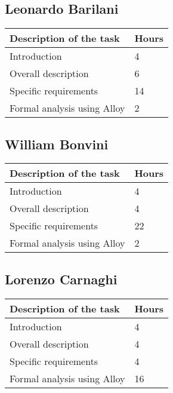 
\subsection{Leonardo Barilani}
\begin{table}[H]
\begin{tabular}{ll}
\hline
\multicolumn{1}{|l|}{Description of the task} & \multicolumn{1}{l|}{Hours} \\ \hline
\multicolumn{1}{|l|}{Introduction}            & \multicolumn{1}{l|}{4}     \\ \hline
\multicolumn{1}{|l|}{Overall description}     & \multicolumn{1}{l|}{6}     \\ \hline
\multicolumn{1}{|l|}{Specific requirements}   & \multicolumn{1}{l|}{14}     \\ \hline
\multicolumn{1}{|l|}{Formal analysis using Alloy}   & \multicolumn{1}{l|}{2}   \\ \hline
\end{tabular}
\end{table}


\subsection{William Bonvini}
\begin{table}[H]
\begin{tabular}{ll}
\hline
\multicolumn{1}{|l|}{Description of the task} & \multicolumn{1}{l|}{Hours} \\ \hline
\multicolumn{1}{|l|}{Introduction}            & \multicolumn{1}{l|}{4}     \\ \hline
\multicolumn{1}{|l|}{Overall description}     & \multicolumn{1}{l|}{4}     \\ \hline
\multicolumn{1}{|l|}{Specific requirements}   & \multicolumn{1}{l|}{22}     \\ \hline
\multicolumn{1}{|l|}{Formal analysis using Alloy}   & \multicolumn{1}{l|}{2}   \\ \hline
\end{tabular}
\end{table}


\subsection{Lorenzo Carnaghi}
\begin{table}[H]
\begin{tabular}{ll}
\hline
\multicolumn{1}{|l|}{Description of the task} & \multicolumn{1}{l|}{Hours} \\ \hline
\multicolumn{1}{|l|}{Introduction}            & \multicolumn{1}{l|}{4}     \\ \hline
\multicolumn{1}{|l|}{Overall description}     & \multicolumn{1}{l|}{4}     \\ \hline
\multicolumn{1}{|l|}{Specific requirements}   & \multicolumn{1}{l|}{4}     \\ \hline
\multicolumn{1}{|l|}{Formal analysis using Alloy}   & \multicolumn{1}{l|}{16}   \\ \hline
\end{tabular}
\end{table}
